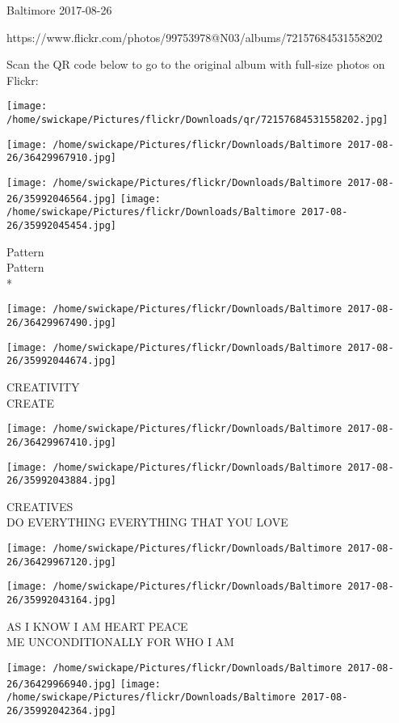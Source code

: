 \documentclass[10pt,letterpaper]{article}
\begin{document}
Baltimore 2017-08-26

https://www.flickr.com/photos/99753978@N03/albums/72157684531558202

Scan the QR code below to go to the original album with full-size photos on Flickr:

\texttt{[image: /home/swickape/Pictures/flickr/Downloads/qr/72157684531558202.jpg]}
\pagebreak

\texttt{[image: /home/swickape/Pictures/flickr/Downloads/Baltimore 2017-08-26/36429967910.jpg]}

\vspace{0.25in}
\texttt{[image: /home/swickape/Pictures/flickr/Downloads/Baltimore 2017-08-26/35992046564.jpg]}
\texttt{[image: /home/swickape/Pictures/flickr/Downloads/Baltimore 2017-08-26/35992045454.jpg]}

Pattern\\
Pattern\\
*
\pagebreak

\texttt{[image: /home/swickape/Pictures/flickr/Downloads/Baltimore 2017-08-26/36429967490.jpg]}

\vspace{0.25in}
\texttt{[image: /home/swickape/Pictures/flickr/Downloads/Baltimore 2017-08-26/35992044674.jpg]}

CREATIVITY\\
CREATE
\pagebreak

\texttt{[image: /home/swickape/Pictures/flickr/Downloads/Baltimore 2017-08-26/36429967410.jpg]}

\vspace{0.25in}
\texttt{[image: /home/swickape/Pictures/flickr/Downloads/Baltimore 2017-08-26/35992043884.jpg]}

CREATIVES\\
DO EVERYTHING EVERYTHING THAT YOU LOVE
\pagebreak

\texttt{[image: /home/swickape/Pictures/flickr/Downloads/Baltimore 2017-08-26/36429967120.jpg]}

\vspace{0.25in}
\texttt{[image: /home/swickape/Pictures/flickr/Downloads/Baltimore 2017-08-26/35992043164.jpg]}

AS I KNOW I AM HEART PEACE\\
ME UNCONDITIONALLY FOR WHO I AM
\pagebreak

\texttt{[image: /home/swickape/Pictures/flickr/Downloads/Baltimore 2017-08-26/36429966940.jpg]}
\texttt{[image: /home/swickape/Pictures/flickr/Downloads/Baltimore 2017-08-26/35992042364.jpg]}
\end{document}
